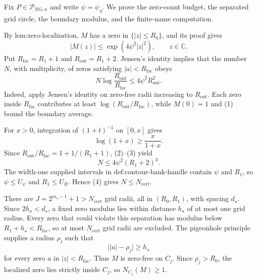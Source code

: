 Fix \(P\in\mathcal P_{\mathrm{NG},n}\) and write \(\psi=\psi_{\eta}\).  We prove the zero-count budget, the separated grid circle, the boundary modulus, and the finite-name computation.

By \(\text{lem:zero-localization}\), \(M\) has a zero in \(\{|z|\le R_0\}\), and its proof gives
\[
 |M(z)|\le \exp(4\psi^2|z|^2),\qquad z\in\mathbb C. \tag{1}
\]
Put \(R_{\mathrm{fac}}=R_1+1\) and \(R_{\mathrm{out}}=R_1+2\).  Jensen's identity implies that the number \(N\), with multiplicity, of zeros satisfying \(|a|<R_{\mathrm{fac}}\) obeys
\[
 N\log\frac{R_{\mathrm{out}}}{R_{\mathrm{fac}}}
 \le4\psi^2R_{\mathrm{out}}^2. \tag{2}
\]
Indeed, apply Jensen's identity on zero-free radii increasing to \(R_{\mathrm{out}}\).  Each zero inside \(R_{\mathrm{fac}}\) contributes at least \(\log(R_{\mathrm{out}}/R_{\mathrm{fac}})\), while \(M(0)=1\) and (1) bound the boundary average.

For \(x>0\), integration of \((1+t)^{-1}\) on \([0,x]\) gives
\[
 \log(1+x)\ge \frac{x}{1+x}. \tag{3}
\]
Since \(R_{\mathrm{out}}/R_{\mathrm{fac}}=1+1/(R_1+1)\), (2)--(3) yield
\[
 N\le4\psi^2(R_1+2)^3. \tag{4}
\]
The width-one supplied intervals in \(\text{def:contour-bank-handle}\) contain \(\psi\) and \(R_1\), so \(\psi\le U_{\psi}\) and \(R_1\le U_R\).  Hence (4) gives \(N\le N_{\mathrm{cert}}\).

There are \(J=2^{m_{\star}-1}+1>N_{\mathrm{cert}}\) grid radii, all in \((R_0,R_1)\), with spacing \(d_{\star}\).  Since \(2h_{\star}<d_{\star}\), a fixed zero modulus lies within distance \(h_{\star}\) of at most one grid radius.  Every zero that could violate this separation has modulus below \(R_1+h_{\star}<R_{\mathrm{fac}}\), so at most \(N_{\mathrm{cert}}\) grid radii are excluded.  The pigeonhole principle supplies a radius \(\rho_j\) such that
\[
 \bigl||a|-\rho_j\bigr|\ge h_{\star} \tag{5}
\]
for every zero \(a\) in \(|z|<R_{\mathrm{fac}}\).  Thus \(M\) is zero-free on \(C_j\).  Since \(\rho_j>R_0\), the localized zero lies strictly inside \(C_j\), so \(N_{C_j}(M)\ge1\).

